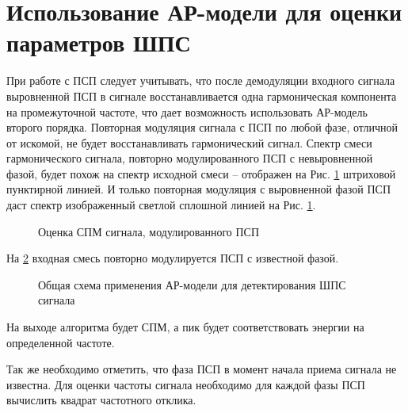 \section{Использование АР-модели для оценки параметров ШПС}

При работе с ПСП следует учитывать, что после демодуляции входного сигнала выровненной ПСП в сигнале восстанавливается одна гармоническая
компонента на промежуточной частоте, что дает возможность использовать АР-модель второго порядка.
Повторная модуляция сигнала с ПСП по любой фазе, отличной от искомой, не будет восстанавливать гармонический сигнал.
Спектр смеси гармонического сигнала, повторно модулированного ПСП с невыровненной фазой, будет похож на спектр исходной смеси – отображен
на Рис. \ref{pic:lpc_psd_1} штриховой пунктирной линией. И только повторная модуляция с выровненной фазой ПСП даст спектр
изображенный светлой сплошной линией на Рис. \ref{pic:lpc_psd_1}.
\begin{figure}[h]
	\center{}
	\caption{Оценка СПМ сигнала, модулированного ПСП}
	\label{pic:lpc_psd_1}
\end{figure}

На \ref{pic:lpc_basic1} входная смесь повторно модулируется ПСП с известной фазой.
\begin{figure}[h]
	\center{}
	\caption{Общая схема применения АР-модели для детектирования ШПС сигнала}
	\label{pic:lpc_basic1}
\end{figure}

На выходе алгоритма будет СПМ, а пик будет соответствовать энергии на определенной частоте.


Так же необходимо отметить, что фаза ПСП в момент начала приема сигнала не известна.
Для оценки частоты сигнала необходимо для каждой фазы ПСП вычислить квадрат частотного
отклика.

